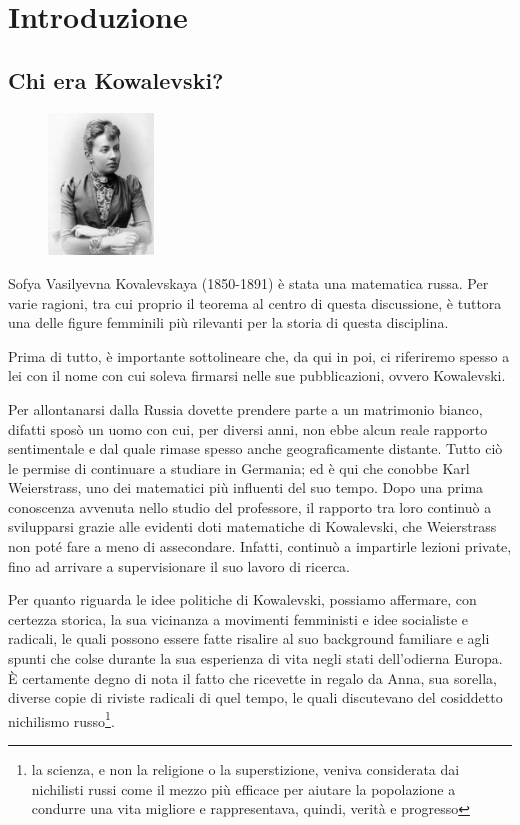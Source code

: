 \chapter{Introduzione}

\section{Chi era Kowalevski?}
\begin{figure}
    \centering
    \includegraphics[width=0.25\textwidth]{kovalevskaya_8}
\end{figure}

Sofya Vasilyevna Kovalevskaya (1850-1891) è stata una matematica russa. Per varie ragioni, tra cui proprio il teorema al centro di questa discussione, è tuttora una delle figure femminili più rilevanti per la storia di questa disciplina.

Prima di tutto, è importante sottolineare che, da qui in poi, ci riferiremo spesso a lei con il nome con cui soleva firmarsi nelle sue pubblicazioni, ovvero Kowalevski.

Per allontanarsi dalla Russia dovette prendere parte a un matrimonio bianco, difatti sposò un uomo con cui, per diversi anni, non ebbe alcun reale rapporto sentimentale e dal quale rimase spesso anche geograficamente distante.
Tutto ciò le permise di continuare a studiare in Germania; ed è qui che conobbe Karl Weierstrass, uno dei matematici più influenti del suo tempo.
Dopo una prima conoscenza avvenuta nello studio del professore, il rapporto tra loro continuò a svilupparsi grazie alle evidenti doti matematiche di Kowalevski, che Weierstrass non poté fare a meno di assecondare. Infatti, continuò a impartirle lezioni private, fino ad arrivare a supervisionare il suo lavoro di ricerca.

Per quanto riguarda le idee politiche di Kowalevski, possiamo affermare, con certezza storica, la sua vicinanza a movimenti femministi e idee socialiste e radicali, le quali possono essere fatte risalire al suo background familiare e agli spunti che colse durante la sua esperienza di vita negli stati dell'odierna Europa. È certamente degno di nota il fatto che ricevette in regalo da Anna, sua sorella, diverse copie di riviste radicali di quel tempo, le quali discutevano del cosiddetto nichilismo russo\footnote{la scienza, e non la religione o la superstizione, veniva considerata dai nichilisti russi come il mezzo più efficace per aiutare la popolazione a condurre una vita migliore e rappresentava, quindi, verità e progresso}.

